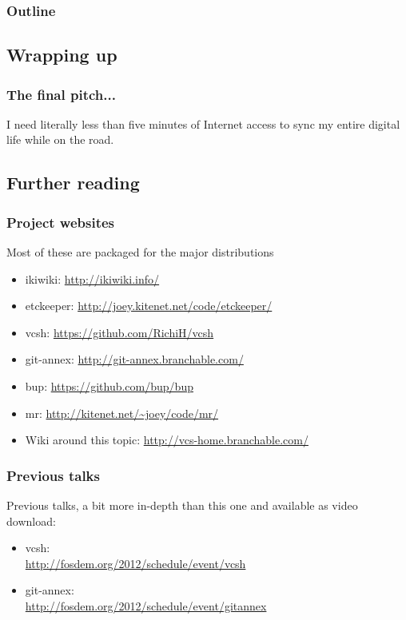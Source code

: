 \documentclass[t]{beamer}
\begin{document}
\begin{frame}
	\frametitle{Outline}
	\tableofcontents[currentsection]
\end{frame}

\subsection{Wrapping up}

\begin{frame}
	\frametitle{The final pitch...}
	\vfill
	I need literally less than five minutes of Internet access to sync my entire digital life while on the road.
	\vfill
\end{frame}

\subsection{Further reading}

\begin{frame}
	\frametitle{Project websites}
	Most of these are packaged for the major distributions
	\begin{itemize}
		\item ikiwiki: \url{http://ikiwiki.info/}
		\item etckeeper: \url{http://joey.kitenet.net/code/etckeeper/}
		\item vcsh: \url{https://github.com/RichiH/vcsh}
		\item git-annex: \url{http://git-annex.branchable.com/}
		\item bup: \url{https://github.com/bup/bup}
		\item mr: \url{http://kitenet.net/~joey/code/mr/}
		\item Wiki around this topic: \url{http://vcs-home.branchable.com/}
	\end{itemize}
\end{frame}

\begin{frame}
	\frametitle{Previous talks}
	Previous talks, a bit more in-depth than this one and available as video download:
	\begin{itemize}
		\item vcsh: \\ \url{http://fosdem.org/2012/schedule/event/vcsh}
		\item git-annex: \\ \url{http://fosdem.org/2012/schedule/event/gitannex}
	\end{itemize}
\end{frame}
\end{document}
